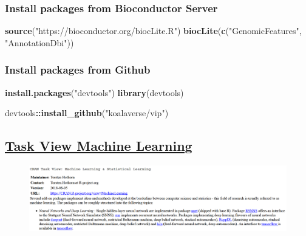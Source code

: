 \documentclass[10pt,]{article}
\newenvironment{Shaded}{\begin{snugshade}}{\end{snugshade}}
\newcommand{\KeywordTok}[1]{\textcolor[rgb]{0.13,0.29,0.53}{\textbf{#1}}}
\newcommand{\StringTok}[1]{\textcolor[rgb]{0.31,0.60,0.02}{#1}}
\newcommand{\OperatorTok}[1]{\textcolor[rgb]{0.81,0.36,0.00}{\textbf{#1}}}
\newcommand{\NormalTok}[1]{#1}
\begin{document}
\subsubsection{Install packages from Bioconductor
Server}\label{install-packages-from-bioconductor-server}

\begin{Shaded}
\begin{Highlighting}[]
\KeywordTok{source}\NormalTok{(}\StringTok{"https://bioconductor.org/biocLite.R"}\NormalTok{)}
\KeywordTok{biocLite}\NormalTok{(}\KeywordTok{c}\NormalTok{(}\StringTok{"GenomicFeatures"}\NormalTok{, }\StringTok{"AnnotationDbi"}\NormalTok{))}
\end{Highlighting}
\end{Shaded}

\subsubsection{Install packages from
Github}\label{install-packages-from-github}

\begin{Shaded}
\begin{Highlighting}[]
\KeywordTok{install.packages}\NormalTok{(}\StringTok{"devtools"}\NormalTok{)}
\KeywordTok{library}\NormalTok{(devtools)}

\NormalTok{devtools}\OperatorTok{::}\KeywordTok{install_github}\NormalTok{(}\StringTok{"koalaverse/vip"}\NormalTok{)}
\end{Highlighting}
\end{Shaded}

\subsection{\texorpdfstring{\href{https://cran.r-project.org/web/views/MachineLearning.html}{Task
View Machine
Learning}}{Task View Machine Learning}}\label{task-view-machine-learning}

\begin{figure}
\centering
\includegraphics[width=1.10000\textwidth]{figure/taskviewmachinelearning.PNG}
\caption{}
\end{figure}
\end{document}
